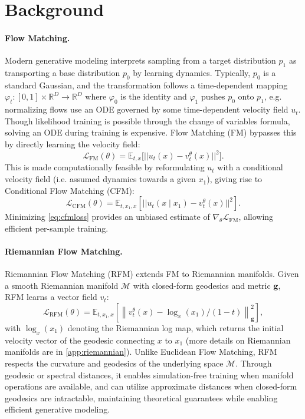 \section{Background}\label{sec:background}

\paragraph{Flow Matching.} Modern generative modeling interprets sampling from a target distribution $p_1$ as transporting a base distribution $p_0$ by learning dynamics. Typically, $p_0$ is a standard Gaussian, and the transformation follows a time-dependent mapping $\varphi_t \colon [0, 1] \times \mathbb{R}^D \to \mathbb{R}^D$ where $\varphi_0$ is the identity and $\varphi_1$ pushes $p_0$ onto $p_1$, e.g. normalizing flows \citep{chen2018neural} use an ODE governed by some time-dependent velocity field $u_t$. Though likelihood training is possible through the change of variables formula, solving an ODE  during training is expensive. Flow Matching (FM) \citep{lipman2023flow} bypasses this by directly learning the velocity field:
\begin{equation}
    \mathcal{L}_{\mathrm{FM}}(\theta) =
\mathbb{E}_{t,x}\bigl[
|| u_t(x) - v_t^\theta(x) ||^2
\bigr].
\end{equation}
This is made computationally feasible by reformulating $u_t$ with a conditional velocity field (i.e. assumed dynamics towards a given $x_1$), giving rise to Conditional Flow Matching (CFM):
\begin{equation}
\label{eq:cfmloss}
\mathcal{L}_{\mathrm{CFM}}(\theta) =
\mathbb{E}_{t,x_1,x}
\left[ || u_t(x \mid x_1) - v_t^\theta(x) ||^2 \right].
\end{equation}
Minimizing \cref{eq:cfmloss} provides an unbiased  estimate of $\nabla_\theta \mathcal{L}_{\mathrm{FM}}$, allowing efficient per-sample training. 

\paragraph{Riemannian Flow Matching.} Riemannian Flow Matching (RFM) \citep{chen2024flow} extends FM to Riemannian manifolds. Given a smooth Riemannian manifold $\mathcal{M}$ with closed-form geodesics and metric $\mathbf{g}$, RFM learns a vector field $v_t$:
\begin{equation}\label{eq:rfm}
\mathcal{L}_{\text{RFM}} (\theta) = \mathbb{E}_{t,x_1,x}\left[\left\|v_t^{\theta}(x) - {\log_{x}(x_1)} / {(1-t)}\right\|_\mathbf{g}^2\right],
\end{equation}  
with $\log_{x}(x_1)$ denoting the Riemannian log map, which returns the initial velocity vector of the geodesic connecting $x$ to $x_1$ (more details on Riemannian manifolds are in \cref{app:riemannian}). 
Unlike Euclidean Flow Matching, RFM respects the curvature and geodesics of the underlying space $\mathcal{M}$. Through geodesic or spectral distances, it enables simulation-free training when manifold operations are available, and can utilize approximate distances when closed-form geodesics are intractable, maintaining theoretical guarantees while enabling efficient generative modeling.

